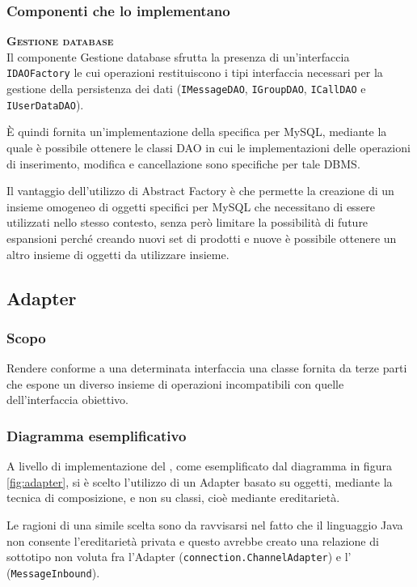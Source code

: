 \subsubsection{Componenti che lo implementano}
\begin{description}
  \item{\bfseries\scshape Gestione database}\\
Il componente Gestione database sfrutta la presenza di un'interfaccia \texttt{IDAOFactory} le cui operazioni restituiscono i tipi interfaccia necessari per la gestione della persistenza dei dati (\texttt{IMessageDAO}, \texttt{IGroupDAO}, \texttt{ICallDAO} e \texttt{IUserDataDAO}).

È quindi fornita un'implementazione della  specifica per MySQL, mediante la quale è possibile ottenere le classi DAO in cui le implementazioni delle operazioni di inserimento, modifica e cancellazione sono specifiche per tale DBMS\@.

Il vantaggio dell'utilizzo di Abstract Factory è che permette la creazione di un insieme omogeneo di oggetti specifici per MySQL che necessitano di essere utilizzati nello stesso contesto, senza però limitare la possibilità di future espansioni perché creando nuovi set di prodotti e nuove  è possibile ottenere un altro insieme di oggetti da utilizzare insieme.
\end{description}

\subsection{Adapter}
\subsubsection{Scopo}
Rendere conforme a una determinata interfaccia una classe fornita da terze parti che espone un diverso insieme di operazioni incompatibili con quelle dell'interfaccia obiettivo.

\subsubsection{Diagramma esemplificativo}
A livello di implementazione del , come esemplificato dal diagramma in figura \ref{fig:adapter}, si è scelto l'utilizzo di un Adapter basato su oggetti, mediante la tecnica di composizione, e non su classi, cioè mediante ereditarietà.

Le ragioni di una simile scelta sono da ravvisarsi nel fatto che il linguaggio Java non consente l'ereditarietà privata e questo avrebbe creato una relazione di sottotipo non voluta fra l'Adapter (\texttt{connection.ChannelAdapter}) e l' (\texttt{MessageInbound}).

